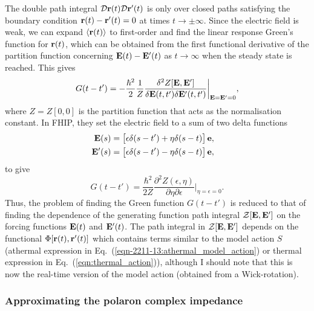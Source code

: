 The double path integral $\mathcal{D}\vb{r}(t) \mathcal{D}\vb{r}'(t)$ is only over closed paths satisfying the boundary condition $\vb{r}(t) - \vb{r}'(t) = 0$ at times $t \to \pm \infty$. Since the electric field is weak, we can expand $\langle \vb{r} (t) \rangle$ to first-order and find the linear response Green's function for $\vb{r}(t)$, which can be obtained from the first functional derivative of the partition function concerning $\vb{E}(t) - \vb{E}'(t)$ as $t \to \infty$ when the steady state is reached. This gives
\begin{equation}
    G(t - t') = - \frac{\hbar^2}{2} \frac{1}{Z} \frac{\delta^2 Z[\vb{E}, \vb{E}']}{\delta \vb{E}(t, t') \delta \vb{E}'(t, t')} \biggr\rvert_{\vb{E}=\vb{E}' = 0},
\end{equation}
where $Z = Z[0, 0]$ is the partition function that acts as the normalisation constant. In FHIP, they set the electric field to a sum of two delta functions
\begin{subequations}
    \begin{align}
        \begin{split}
            \vb{E}(s) &= \left[\epsilon \delta(s - t') + \eta \delta(s - t)\right] \vb{e},
        \end{split}\\
        \begin{split}
            \vb{E}'(s) &= \left[\epsilon \delta(s - t') - \eta \delta(s - t)\right] \vb{e},
        \end{split}
    \end{align}
\end{subequations}
to give
\begin{equation}
    G(t - t') = \frac{\hbar^2}{2Z}\frac{\partial^2 Z(\epsilon, \eta)}{\partial\eta\partial\epsilon} \biggr\rvert_{\eta=\epsilon=0}.
\end{equation}
Thus, the problem of finding the Green function $G(t - t')$ is reduced to that of finding the dependence of the generating function path integral $\mathcal{Z[\vb{E}, \vb{E}']}$ on the forcing functions $\vb{E}(t)$ and $\vb{E}'(t)$. The path integral in $\mathcal{Z[\vb{E}, \vb{E}']}$ depends on the functional $\Phi[\vb{r}(t), \vb{r}'(t)]$ which contains terms similar to the model action $S$ (athermal expression in Eq.~(\ref{eqn-2211-13:athermal_model_action}) or thermal expression in Eq.~(\ref{eqn:thermal_action})), although I should note that this is now the real-time version of the model action (obtained from a Wick-rotation). 

\subsubsection{Approximating the polaron complex impedance}
\label{subsubsec:2-3-1-1}

